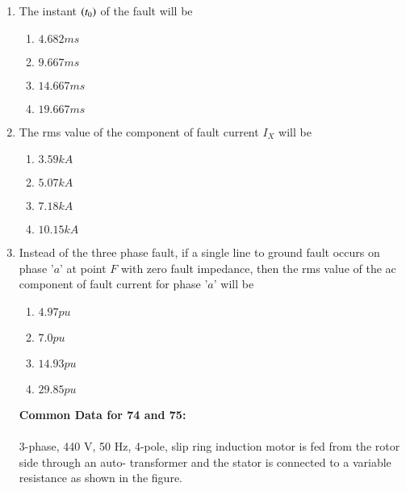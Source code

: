 \documentclass[journal]{IEEEtran}
\begin{document}
\begin{enumerate}
\item The instant $\left(t_0\right)$ of the fault will be 
\begin{enumerate}
    \item $4.682 ms$
    \item $9.667 ms$
    \item $14.667 ms$
    \item $19.667 ms$
\end{enumerate}
\item The rms value of the component of fault current $I_X$ will be 
\begin{enumerate}
    \item $3.59kA$ 
    \item $5.07kA$
    \item $7.18kA$
    \item $10.15kA$
\end{enumerate}
\item Instead of the three phase fault, if a single line to ground fault occurs on phase '$a$' at point $F$ with zero fault impedance, then the rms value of the ac component of fault current  for phase '$a$' will be
\begin{enumerate}
    \item $4.97 pu$
    \item $7.0 pu$
    \item $14.93 pu$
    \item $29.85 pu$
\end{enumerate}
 \textbf{Common Data for 74 and 75:}\\\\
3-phase, 440 V, 50 Hz, 4-pole, slip ring induction motor is fed from the rotor side through an auto- transformer and the stator is connected to a variable resistance as shown in the figure.\\\\\\\\\\\\\\\\


\end{enumerate}
\end{document}
